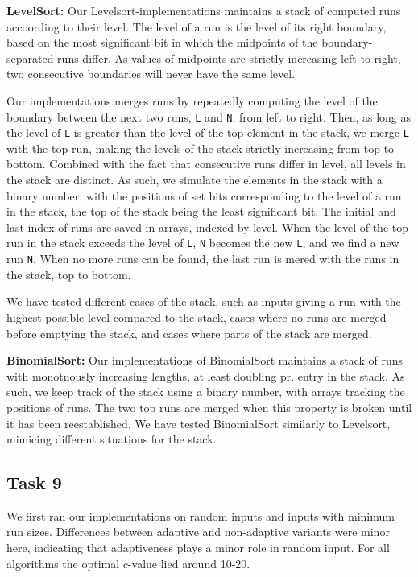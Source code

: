 \documentclass[11pt, a4paper]{article}
\begin{document}
\textbf{LevelSort:} Our Levelsort-implementations maintains a stack of computed runs accoording to their level. The level of a run is the level of its right boundary, based on the most significant bit in which the midpoints of the boundary-separated runs differ. As values of midpoints are strictly increasing left to right, two consecutive boundaries will never have the same level.

Our implementations merges runs by repeatedly computing the level of the boundary between the next two runs, \verb|L| and \verb|N|, from left to right. Then, as long as the level of \verb|L| is greater than the level of the top element in the stack, we merge \verb|L| with the top run, making the levels of the stack strictly increasing from top to bottom. Combined with the fact that consecutive runs differ in level, all levels in the stack are distinct. As such, we simulate the elements in the stack with a binary number, with the positions of set bits corresponding to the level of a run in the stack, the top of the stack being the least significant bit. The initial and last index of runs are saved in arrays, indexed by level. When the level of the top run in the stack exceeds the level of \verb|L|, \verb|N| becomes the new \verb|L|, and we find a new run \verb|N|. When no more runs can be found, the last run is mered with the runs in the stack, top to bottom.

We have tested different cases of the stack, such as inputs giving a run with the highest possible level compared to the stack, cases where no runs are merged before emptying the stack, and cases where parts of the stack are merged.

\textbf{BinomialSort:} Our implementations of BinomialSort maintains a stack of runs with monotnously increasing lengths, at least doubling pr. entry in the stack. As such, we keep track of the stack using a binary number, with arrays tracking the positions of runs. The two top runs are merged when this property is broken until it has been reestablished. We have tested BinomialSort similarly to Levelsort, mimicing different situations for the stack.



\subsection{Task 9}

We first ran our implementations on random inputs and inputs with minimum run sizes. Differences between adaptive and non-adaptive variants were minor here, indicating that adaptiveness plays a minor role in random input. For all algorithms the optimal $c$-value lied around 10-20.
\end{document}
